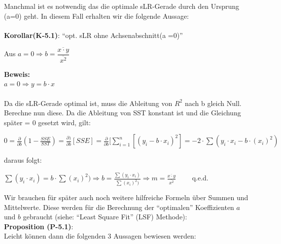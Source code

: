 \documentclass[12pt]{article}
\begin{document}
%
Manchmal ist es notwendig das die optimale sLR-Gerade durch den Ursprung (a=0) geht. In diesem Fall erhalten wir die folgende Aussage:\\
\\[0.2cm]
\textbf{Korollar(K-5.1)}: “opt. sLR ohne Achsenabschnitt(a =0)”\\
\begin{center}
\begin{large}
Aus $ a=0 \Rightarrow b = {\dfrac{\overline{x \cdot y}}{\overline{x^2}}}$  \\[0.2cm]                                          
\end{large}
\end{center}
\textbf{Beweis:}\\
$ a = 0 \Rightarrow y = b \cdot x$\\\\[0.1cm]
%                                                                           
Da die sLR-Gerade optimal ist, muss die Ableitung von $R^2$ nach b gleich Null. Berechne nun diese. Da die Ableitung von SST konstant ist und die Gleichung später = 0 gesetzt wird, gilt: 
\begin{center}
\begin{large}
$ 0 =\frac{\partial}{\partial b} (1-\frac{SSE}{SST}) = \frac{\partial)}{\partial b} [SSE] = \frac{\partial}{\partial b}[\sum\limits_{i=1}^n [(y_i - b \cdot x_i)^2] = -2 \cdot \sum(y_i \cdot x_i - b \cdot (x_i)^2) $ 
\end{large}
\end{center}
daraus folgt:
\begin{center}
\begin{large}
$ \sum(y_i \cdot x_i) =  b \cdot \sum(x_i)^2) \Rightarrow b = \frac{\sum(y_i \cdot x_i) }{\sum(x_i)^2)} \Rightarrow m = \frac{\overline{x \cdot y}}{\overline{x^2}} \qquad $ q.e.d.     \\[0.5cm] 
\end{large}
\end{center} 
%
Wir brauchen für später auch noch weitere hilfreiche Formeln über Summen und Mittelwerte. Diese werden für die Berechnung der “optimalen” Koeffizienten $a$ und $b$ gebraucht (siehe: “Least Square Fit” (LSF) Methode):\\[0.8cm]
%                                                                                                                                     
\textbf{Proposition (P-5.1)}:\\[0.2cm]
%
Leicht können dann die folgenden 3 Aussagen bewiesen werden: \\
\end{document}
